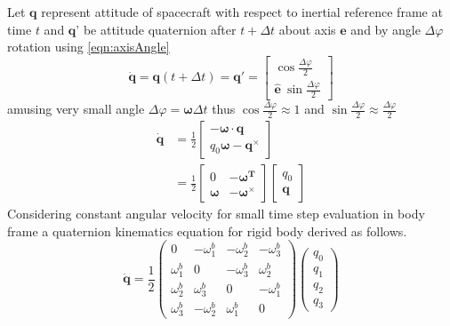 Let $\displaystyle \mathbf{q}$ represent attitude of spacecraft with respect to inertial reference frame at time $\displaystyle t$ and $\displaystyle \mathbf{q}$' be attitude quaternion after $\displaystyle t+\Delta t$ about axis $\displaystyle \hat{\mathbf{e}}$ and by angle $\displaystyle \Delta \varphi $ rotation using \autoref{eqn:axisAngle}
\begin{equation}
\dot{\mathbf{q}} =\mathbf{q}( t+\Delta t) =\mathbf{q} '=\begin{bmatrix}
\cos\frac{\Delta \varphi }{2}\\
\hat{\mathbf{e}} \ \sin\frac{\Delta \varphi }{2}
\end{bmatrix}
\end{equation}
amusing very small angle $\displaystyle \Delta \varphi =\mathbf{\omega } \Delta t$ thus $\displaystyle \cos\frac{\Delta \varphi }{2} \approx 1$ and $\displaystyle \sin\frac{\Delta \varphi }{2} \approx \frac{\Delta \varphi }{2}$
\begin{equation}
\begin{aligned}
\dot{\mathbf{q}} & =\frac{1}{2}
\begin{bmatrix}
-\mathbf{\omega } \cdot \mathbf{q}\\
 q_{0}\mathbf{\omega } -\mathbf{q}^{\times }
\end{bmatrix}\\
 & =\frac{1}{2}\begin{bmatrix}
0 & -\mathbf{\omega^T }\\
\mathbf{\omega } & -\mathbf{\omega }^{\times }
\end{bmatrix}\begin{bmatrix}
q_{0}\\
\mathbf{q}
\end{bmatrix}
\end{aligned}
\end{equation}
Considering constant angular velocity for small time step evaluation in body frame a quaternion kinematics equation for rigid body derived as follows.
\begin{equation}
\dot{\mathbf{q}} =\frac{1}{2}\begin{pmatrix}
0 & -\omega^b_{1} & -\omega^b_{2} & -\omega^b_{3}\\
\omega^b_{1} & 0 & -\omega^b_{3} & \omega^b_{2}\\
\omega^b_{2} & \omega^b_{3} & 0 & -\omega^b_{1}\\
\omega^b_{3} & -\omega^b_{2} & \omega^b_{1} & 0
\end{pmatrix}\begin{pmatrix}
q_{0}\\
q_{1}\\
q_{2}\\
q_{3}
\end{pmatrix}
\end{equation}
